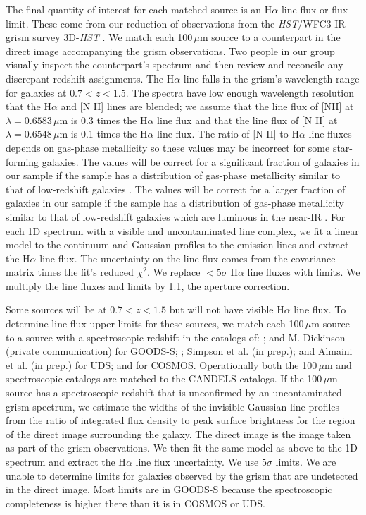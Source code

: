 \documentclass[referee]{aa}
\begin{document}
The final quantity of interest for each matched source is an H$\alpha$ line
flux or flux limit.  These come from our reduction of observations from the
\emph{HST}/WFC3-IR grism survey 3D-\emph{HST} \citep{brammer12}.
We match each 100$\,\mu$m source to a counterpart in the direct image
accompanying the grism observations.  Two people in our group visually inspect
the counterpart's spectrum and then review and reconcile any discrepant redshift
assignments.  The
H$\alpha$ line falls in the grism's wavelength range for galaxies at
$0.7 < z < 1.5$.  The spectra have low enough wavelength resolution that the
H$\alpha$ and [N II] lines are blended; we assume that the line flux of [NII]
at $\lambda = 0.6583\,\mu$m is 0.3 times the H$\alpha$ line flux and that
the line flux of [N II] at $\lambda = 0.6548\,\mu$m is 0.1 times the
H$\alpha$ line flux.  The ratio of [N II] to H$\alpha$ line fluxes depends on
gas-phase metallicity so these values may be incorrect for some star-forming
galaxies.
The values will be correct for a significant fraction of galaxies in our
sample if the sample has a distribution of
gas-phase metallicity similar to that of low-redshift galaxies
\citep{kauffmann03}.  The values will be correct for a larger fraction of
galaxies in our sample if the sample has a distribution of gas-phase
metallicity similar to that of low-redshift galaxies which are luminous in
the near-IR \citep{weiner07}.  For each 1D spectrum with a visible and
uncontaminated
line complex, we fit a linear model to the continuum and Gaussian profiles to
the emission lines and extract the H$\alpha$ line flux.  The uncertainty on the
line flux comes from the covariance matrix times the fit's reduced $\chi^{2}$.
We replace $< 5\sigma$ H$\alpha$ line fluxes with limits.  We multiply the line
fluxes and limits by 1.1, the aperture correction.

Some sources will be at $0.7 < z < 1.5$ but will not have visible H$\alpha$
line flux.  To determine line flux upper limits for these sources, we match each
100$\,\mu$m source to a source with a spectroscopic redshift in
the catalogs of:
\citet{lefevre04,szokoly04,mignoli05,ravikumar07,vanzella08,
balestra10,fadda10,kurk13,santini14}; and M. Dickinson (private communication)
for GOODS-S;
\citet{yamada05,simpson12}; Simpson et al. (in prep.); and
Almaini et al. (in prep.) for UDS; and \citet{lilly09} for COSMOS.  Operationally both the
100$\,\mu$m and spectroscopic catalogs are matched to the CANDELS catalogs.
If the 100$\,\mu$m source has a spectroscopic redshift that is unconfirmed
by an uncontaminated grism spectrum, we estimate the widths of the invisible
Gaussian line profiles from the ratio of integrated flux density to peak
surface brightness for the region of the direct image surrounding the galaxy.
The direct
image is the image taken as part of the grism observations.  We then fit
the same model as above to the 1D spectrum and extract the H$\alpha$ line flux
uncertainty.  We use $5\sigma$ limits.  We are unable to determine limits for
galaxies observed by the grism that are undetected in the direct image.  Most
limits are in GOODS-S because the spectroscopic completeness is higher there
than it is in COSMOS or UDS.
\end{document}
